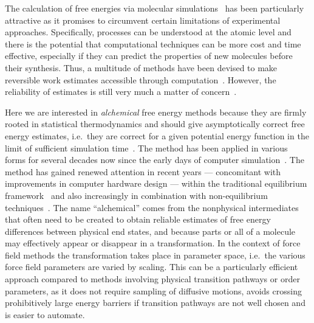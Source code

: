 \documentclass[journal=jctcce,manuscript=article]{achemso}
\begin{document}
The calculation of free energies via molecular
simulations~\cite{hansen_practical_2014, doi:10.1021/jp102971x,
  Gallicchio201127, doi:10.1080/08927022.2015.1132317,
  doi:10.1146/annurev.matsci.32.111901.153708} has been particularly
attractive as it promises to circumvent certain limitations of experimental
approaches. Specifically, processes can be understood at the atomic level and there is the potential that computational techniques can be
more cost and time effective, especially if they can predict the properties of new molecules before their synthesis.
Thus, a multitude of methods have been devised
 to make reversible work estimates accessible through
computation~\cite{hansen_practical_2014,
  doi:10.1021/jp102971x, Gallicchio201127,
  doi:10.1080/08927022.2015.1132317,
  doi:10.1146/annurev.matsci.32.111901.153708}.  However, the
reliability of estimates is still very much a matter of
concern~\cite{doi:10.1021/jp102971x, doi:10.1021/acs.jctc.5b00179}.

Here we are interested in \emph{alchemical} free energy methods because they
are firmly rooted in statistical thermodynamics and should give asymptotically
correct free energy estimates, i.e.\ they are correct for a given potential
energy function in the limit of sufficient simulation
time~\cite{Beveridge-citeulike:3789890, straatsma:92, doi:10.1021/cr00023a004,
hansen_practical_2014}.  The method has been applied in various forms for
several decades now since the early days of computer
simulation~\cite{doi:10.1063/1.1671118, bennett_efficient_1976,
doi:10.1063/1.432264, FS9821700055,  Tembe1984281, doi:10.1063/1.449208}.  The
method has gained renewed attention in recent years --- concomitant with
improvements in computer hardware design --- within the traditional equilibrium
framework~\cite{GILSON19971047, doi:10.1021/jp0217839, deng_computations_2009}
and also increasingly in combination with non-equilibrium
techniques~\cite{ytreberg_comparison_2006, JCC:JCC23804,
  doi:10.1021/ct500964e}.  The name ``alchemical'' comes from the nonphysical
intermediates that often need to be created to obtain reliable estimates of
free energy differences between physical end states, and because parts or
all of a molecule may effectively appear or disappear in a transformation.  In the
context of force field methods the transformation takes place in parameter
space, i.e.\ the various force field parameters are varied by scaling.  This
can be a particularly efficient approach compared to methods involving physical transition pathways or order parameters, as it does not require sampling of
diffusive motions, avoids crossing prohibitively large energy barriers if
transition pathways are not well chosen and is easier to automate.
\end{document}
